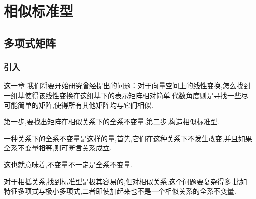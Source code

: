 \newpage
\chapter{相似标准型}
\section{多项式矩阵}
\subsection{引入}
这一章
我们将要开始研究曾经提出的问题：对于向量空间上的线性变换,怎么找到一组基使得该线性变换在这组基下的表示矩阵相对简单.代数角度则是寻找一些尽可能简单的矩阵,使得所有其他矩阵均与它们相似.

第一步,要找出矩阵在相似关系下的全系不变量.第二步,构造相似标准型.

\begin{red}
\begin{remark}
    一种关系下的全系不变量是这样的量,首先,它们在这种关系下不发生改变,并且如果全系不变量相等,则可断言关系成立.

    这也就意味着,不变量不一定是全系不变量.

    对于相抵关系,找到标准型是极其容易的,但对相似关系,这个问题要复杂得多.比如特征多项式与极小多项式,二者即使加起来也不是一个相似关系的全系不变量.
\end{remark}
\end{red}
